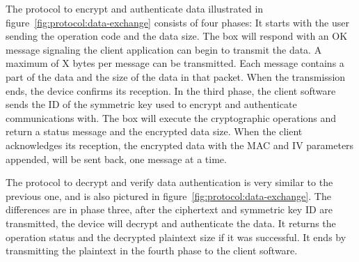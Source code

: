 The protocol to encrypt and authenticate data illustrated in figure~\ref{fig:protocol:data-exchange} consists of four phases:
It starts with the user sending the operation code and the data size. The box will respond with an OK message signaling the client application can begin to transmit the data. A maximum of X bytes per message can be transmitted. Each message contains a part of the data and the size of the data in that packet. When the transmission ends, the device confirms its reception.
In the third phase, the client software sends the ID of the symmetric key used to encrypt and authenticate communications with. The box will execute the cryptographic operations and return a status message and the encrypted data size.
When the client acknowledges its reception, the encrypted data with the \ac{MAC} and \ac{IV} parameters appended, will be sent back, one message at a time.

The protocol to decrypt and verify data authentication is very similar to the previous one, and is also pictured in figure~\ref{fig:protocol:data-exchange}. The differences are in phase three, after the ciphertext and symmetric key ID are transmitted, the device will decrypt and authenticate the data. It returns the operation status and the decrypted plaintext size if it was successful. It ends by transmitting the plaintext in the fourth phase to the client software.

